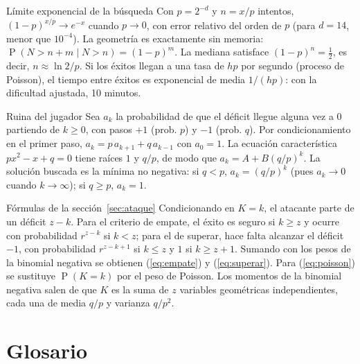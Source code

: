 \documentclass[11pt,a4paper]{article}
\newcommand{\Prob}[1]{\operatorname{P}\!\left(#1\right)}
\newcommand{\webhint}[1]{}
\begin{document}
\begin{resultado}{Límite exponencial de la búsqueda}\label{der:exponencial}
Con $p=2^{-d}$ y $n=x/p$ intentos, $(1-p)^{x/p}\to e^{-x}$ cuando $p\to 0$, con error relativo del orden de $p$ (para $d=14$, menor que $10^{-4}$). La geometría es exactamente sin memoria: $\Prob{N>n+m\mid N>n}=(1-p)^m$. La mediana satisface $(1-p)^n=\tfrac12$, es decir, $n\approx\ln2/p$. Si los éxitos llegan a una tasa de $hp$ por segundo (proceso de Poisson), el tiempo entre éxitos es exponencial de media $1/(hp)$: con la dificultad ajustada, 10 minutos.
\end{resultado}

\begin{resultado}{Ruina del jugador}\label{der:ruina}
Sea $a_k$ la probabilidad de que el déficit llegue alguna vez a $0$ partiendo de $k\ge0$, con pasos $+1$ (prob. $p$) y $-1$ (prob. $q$). Por condicionamiento en el primer paso, $a_k=p\,a_{k+1}+q\,a_{k-1}$ con $a_0=1$. La ecuación característica $p x^2-x+q=0$ tiene raíces $1$ y $q/p$, de modo que $a_k=A+B(q/p)^k$. La solución buscada es la mínima no negativa: si $q<p$, $a_k=(q/p)^k$ (pues $a_k\to0$ cuando $k\to\infty$); si $q\ge p$, $a_k=1$.
\end{resultado}

\begin{resultado}{Fórmulas de la sección~\ref{sec:ataque}}\label{der:formulas}
Condicionando en $K=k$, el atacante parte de un déficit $z-k$. Para el criterio de empate, el éxito es seguro si $k\ge z$ y ocurre con probabilidad $r^{z-k}$ si $k<z$; para el de superar, hace falta alcanzar el déficit $-1$, con probabilidad $r^{z-k+1}$ si $k\le z$ y $1$ si $k\ge z+1$. Sumando con los pesos de la binomial negativa se obtienen (\ref{eq:empate}) y (\ref{eq:superar}). Para (\ref{eq:poisson}) se sustituye $\Prob{K=k}$ por el peso de Poisson. Los momentos de la binomial negativa salen de que $K$ es la suma de $z$ variables geométricas independientes, cada una de media $q/p$ y varianza $q/p^{2}$.
\end{resultado}

\section*{Glosario}
\webhint{section; id=glosario; slug=glosario; kicker=referencia; role=reference}
\end{document}
